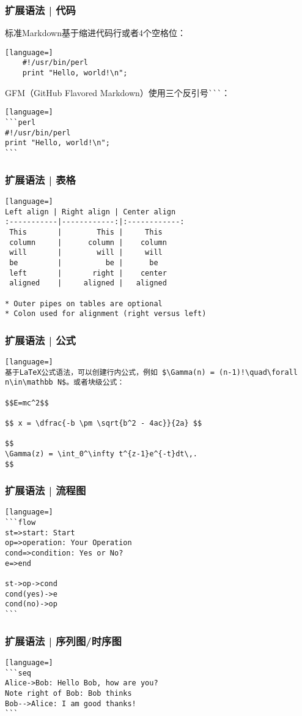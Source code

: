 \begin{frame}[fragile]
  \frametitle{扩展语法 | \alert{代码}}
  标准Markdown基于缩进代码行或者4个空格位：
\begin{lstlisting}[language=]
    #!/usr/bin/perl
    print "Hello, world!\n";
\end{lstlisting}
  GFM（GitHub Flavored Markdown）使用三个反引号\verb|```|：
\begin{lstlisting}[language=]
```perl
#!/usr/bin/perl
print "Hello, world!\n";
```
\end{lstlisting}
\end{frame}

\begin{frame}[fragile]
  \frametitle{扩展语法 | \alert{表格}}
\begin{lstlisting}[language=]
Left align | Right align | Center align 
:-----------|------------:|:------------:
 This       |        This |     This     
 column     |      column |    column    
 will       |        will |     will     
 be         |          be |      be      
 left       |       right |    center    
 aligned    |     aligned |   aligned 

* Outer pipes on tables are optional
* Colon used for alignment (right versus left)
\end{lstlisting}
\end{frame}

\begin{frame}[fragile]
  \frametitle{扩展语法 | 公式}
\begin{lstlisting}[language=]
基于LaTeX公式语法，可以创建行内公式，例如 $\Gamma(n) = (n-1)!\quad\forall n\in\mathbb N$。或者块级公式：

$$E=mc^2$$

$$ x = \dfrac{-b \pm \sqrt{b^2 - 4ac}}{2a} $$

$$
\Gamma(z) = \int_0^\infty t^{z-1}e^{-t}dt\,.
$$
\end{lstlisting}
\end{frame}

\begin{frame}[fragile]
  \frametitle{扩展语法 | 流程图}
\begin{lstlisting}[language=]
```flow
st=>start: Start
op=>operation: Your Operation
cond=>condition: Yes or No?
e=>end

st->op->cond
cond(yes)->e
cond(no)->op
```
\end{lstlisting}
\end{frame}

\begin{frame}[fragile]
  \frametitle{扩展语法 | 序列图/时序图}
\begin{lstlisting}[language=]
```seq
Alice->Bob: Hello Bob, how are you?
Note right of Bob: Bob thinks
Bob-->Alice: I am good thanks!
```
\end{lstlisting}
\end{frame}

